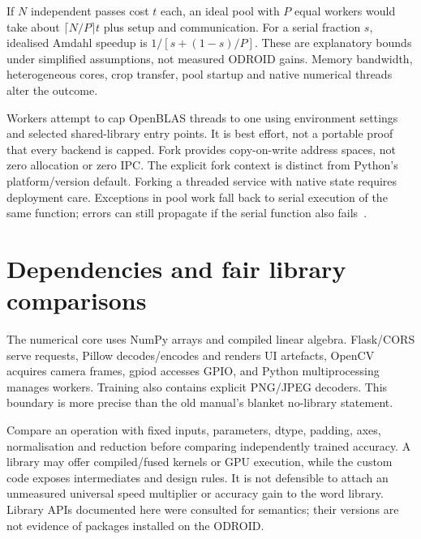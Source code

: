 If $N$ independent passes cost $t$ each, an ideal pool with $P$ equal workers
would take about $\lceil N/P\rceil t$ plus setup and communication. For a
serial fraction $s$, idealised Amdahl speedup is
$1/[s+(1-s)/P]$. These are explanatory bounds under simplified assumptions,
not measured ODROID gains. Memory bandwidth, heterogeneous cores, crop transfer,
pool startup and native numerical threads alter the outcome.

Workers attempt to cap OpenBLAS threads to one using environment settings and
selected shared-library entry points. It is best effort, not a portable proof
that every backend is capped. Fork provides copy-on-write address spaces,
not zero allocation or zero IPC. The explicit fork context is distinct from
Python's platform/version default. Forking a threaded service with native
state requires deployment care. Exceptions in pool work fall back to serial
execution of the same function; errors can still propagate if the serial
function also fails~\cite{pythonmp,numpymatmul}.

\section{Dependencies and fair library comparisons}
The numerical core uses NumPy arrays and compiled linear algebra. Flask/CORS
serve requests, Pillow decodes/encodes and renders UI artefacts, OpenCV acquires
camera frames, gpiod accesses GPIO, and Python multiprocessing manages workers.
Training also contains explicit PNG/JPEG decoders. This boundary is more precise
than the old manual's blanket no-library statement.

Compare an operation with fixed inputs, parameters, dtype, padding, axes,
normalisation and reduction before comparing independently trained accuracy.
A library may offer compiled/fused kernels or GPU execution, while the custom
code exposes intermediates and design rules. It is not defensible to attach
an unmeasured universal speed multiplier or accuracy gain to the word library.
Library APIs documented here were consulted for semantics; their versions
are not evidence of packages installed on the ODROID.
